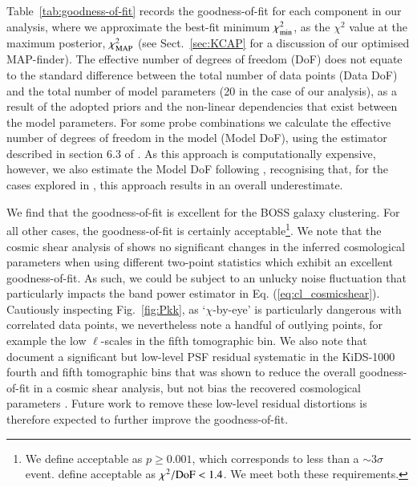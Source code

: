 Table~\ref{tab:goodness-of-fit} records the goodness-of-fit for each component in our \tttp analysis, where we approximate the best-fit minimum $\chi^2_{\rm min}$, as the $\chi^2$ value at the maximum posterior, $\chi^2_{\rm MAP}$ (see Sect.~\ref{sec:KCAP} for a discussion of our optimised MAP-finder).  The effective number of degrees of freedom (DoF) does not equate to the standard difference between the total number of data points (Data DoF) and the total number of model parameters (20 in the case of our \tttp analysis), as a result of the adopted priors and the non-linear dependencies that exist between the model parameters.   For some probe combinations we calculate the effective number of degrees of freedom in the model (Model DoF), using the estimator described in section 6.3 of \citet{joachimi/etal:inprep}.    As this approach is computationally expensive, however, we also estimate the Model DoF following \citet{Raveri2019}, recognising that, for the cases explored in \citet{joachimi/etal:inprep}, this approach results in an overall underestimate.


We find that the goodness-of-fit is excellent for the BOSS galaxy clustering.  For all other cases, the goodness-of-fit is certainly acceptable\footnote{We define acceptable as $p \geq 0.001$, which corresponds to less than a $\sim 3\sigma$ event.   \citet{abbott/etal:2018} define acceptable as $\chi^2/{\rm DoF} < 1.4$.  We meet both these requirements.}.
We note that the cosmic shear analysis of \citet{asgari/etal:inprep} shows no significant changes in the inferred cosmological parameters when using different two-point statistics which exhibit an excellent goodness-of-fit.    As such, we could be subject to an unlucky noise fluctuation that particularly impacts the band power estimator in Eq. (\ref{eq:cl_cosmicshear}).  Cautiously inspecting Fig.~\ref{fig:Pkk}, as `$\chi$-by-eye' is particularly dangerous with correlated data points, we nevertheless note a handful of outlying points, for example the low $\ell$-scales in the fifth tomographic bin.   We also note that \citet{giblin/etal:inprep} document a significant but low-level PSF residual systematic in the KiDS-1000 fourth and fifth tomographic bins that was shown to reduce the overall goodness-of-fit in a cosmic shear analysis, but not bias the recovered cosmological parameters \citep[see also the discussion in][]{amara/refregier:2008}.  Future work to remove these low-level residual distortions is therefore expected to further improve the goodness-of-fit.

